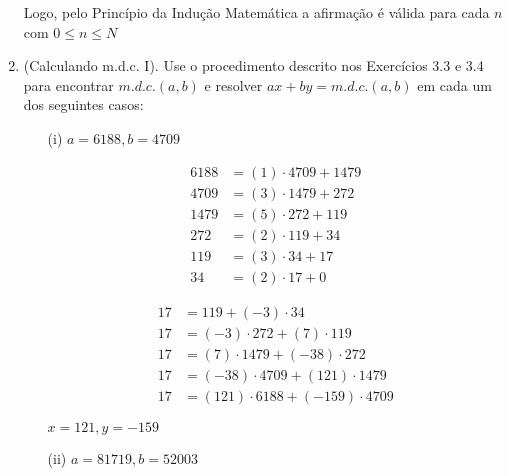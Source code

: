 \documentclass[a4paper,12pt]{article}
\begin{document}
\begin{enumerate}[label=3.\arabic*.]
    Logo, pelo Princípio da Indução Matemática a afirmação é válida para cada $n$ com $0 \leq n \leq N$
    
    \item (Calculando m.d.c. I). Use o procedimento descrito nos Exercícios 3.3 e 3.4 para 
    encontrar $m.d.c.(a,b)$ e resolver $ax + by = m.d.c.(a,b)$ em cada um dos seguintes casos:
    \begin{itemize}
        \item[(i)] $a = 6188, b = 4709$
        
        \begin{minipage}[t]{0.4\linewidth}
            \begin{align*}
                6188 &= (1)\cdot 4709 + 1479 \\
                4709 &= (3)\cdot 1479 + 272 \\
                1479 &= (5)\cdot 272 + 119 \\
                272 &= (2)\cdot 119 + 34 \\
                119 &= (3)\cdot 34 + 17 \\
                34 &= (2)\cdot 17 + 0
            \end{align*}
        \end{minipage}\hfill
        \begin{minipage}[t]{0.6\linewidth}
            \begin{align*}
                17 &= 119 + (-3)\cdot 34 \\
                17 &= (-3)\cdot 272 + (7)\cdot 119 \\
                17 &= (7)\cdot 1479 + (-38)\cdot 272 \\
                17 &= (-38)\cdot 4709 + (121)\cdot 1479 \\
                17 &= (121)\cdot 6188 + (-159)\cdot 4709
            \end{align*}
        \end{minipage}

        $\boxed{x = 121, y = -159}$

        \item[(ii)] $a = 81719, b = 52003$
        

\end{itemize}
\end{enumerate}
\end{document}
